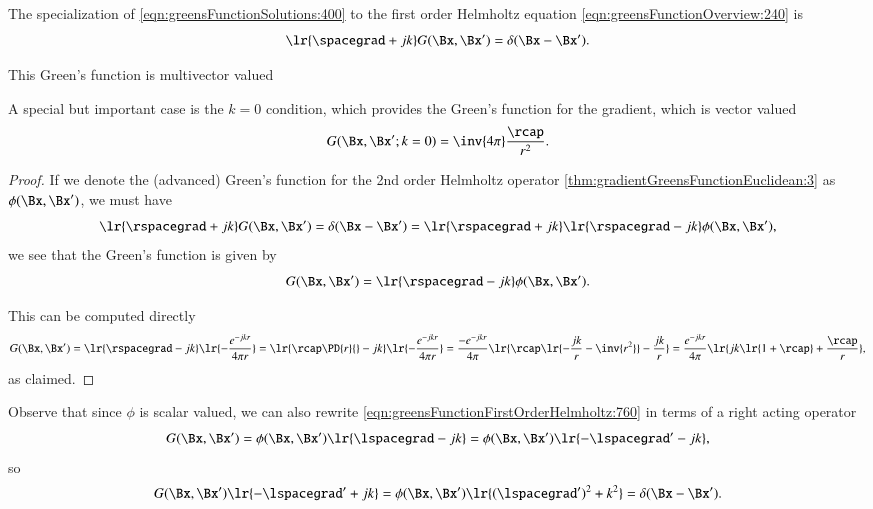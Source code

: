 %
%

The specialization of \cref{eqn:greensFunctionSolutions:400} to the first order Helmholtz equation \cref{eqn:greensFunctionOverview:240} is
\begin{dmath}\label{eqn:greensFunctionFirstOrderHelmholtz:700}
\lr{ \spacegrad + j k } G(\Bx, \Bx')  = \delta(\Bx - \Bx').
\end{dmath}

This Green's function is multivector valued


A special but important case is the \( k = 0 \) condition, which provides the
Green's function for the gradient, which is vector valued
\begin{equation}\label{eqn:greensFunctionFirstOrderHelmholtz:900}
G(\Bx, \Bx' ; k = 0) = \inv{4 \pi} \frac{\rcap}{r^2}.
\end{equation}
\begin{proof}
If we denote the (advanced) Green's function for the 2nd order Helmholtz operator
\cref{thm:gradientGreensFunctionEuclidean:3}
as \( \phi(\Bx, \Bx') \), we must have
\begin{equation}\label{eqn:greensFunctionFirstOrderHelmholtz:740}
\lr{ \rspacegrad + j k } G(\Bx, \Bx') = \delta(\Bx - \Bx') =
\lr{ \rspacegrad + j k } \lr{ \rspacegrad - j k } \phi(\Bx, \Bx'),
\end{equation}
we see that the Green's function is given by
\begin{dmath}\label{eqn:greensFunctionFirstOrderHelmholtz:760}
G(\Bx, \Bx')
=
\lr{ \rspacegrad - j k } \phi(\Bx, \Bx').
\end{dmath}

This can be computed directly
\begin{dmath}\label{eqn:greensFunctionFirstOrderHelmholtz:780}
G(\Bx, \Bx')
=
\lr{ \rspacegrad - j k } \lr{ -\frac{e^{-j k r}}{4 \pi r} }
=
\lr{ \rcap \PD{r}{} -j k } \lr{ -\frac{e^{-j k r}}{4 \pi r} }
=
\frac{-e^{-j k r}}{4 \pi}
\lr{
\rcap \lr{ -\frac{j k}{r} - \inv{ r^2 } } - \frac{j k}{r}
}
=
\frac{e^{-j k r}}{4 \pi}
\lr{
j k \lr{ 1 + \rcap } + \frac{\rcap}{r}
},
\end{dmath}
as claimed.
\end{proof}
Observe that since \( \phi \) is scalar valued, we can also rewrite
\cref{eqn:greensFunctionFirstOrderHelmholtz:760} in terms of a right acting operator
\begin{dmath}\label{eqn:greensFunctionFirstOrderHelmholtz:800}
G(\Bx, \Bx')
=
\phi(\Bx, \Bx')
\lr{ \lspacegrad - j k }
=
\phi(\Bx, \Bx')
\lr{ -\lspacegrad' - j k },
\end{dmath}
so
\begin{equation}\label{eqn:greensFunctionFirstOrderHelmholtz:820}
G(\Bx, \Bx') \lr{ -\lspacegrad' + j k } =
\phi(\Bx, \Bx') \lr{ (\lspacegrad')^2 + k^2 }
=
\delta(\Bx - \Bx').
\end{equation}

